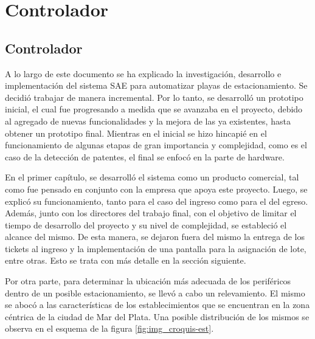 \chapter{Controlador}  \label{cap:Controlador}

\section{Controlador}

A lo largo de este documento se ha explicado la investigación, desarrollo e implementación del sistema SAE para automatizar playas de estacionamiento. Se decidió trabajar de manera incremental. Por lo tanto, se desarrolló un prototipo inicial, el cual fue progresando a medida que se avanzaba en el proyecto, debido al agregado de nuevas funcionalidades y la mejora de las ya existentes, hasta obtener un prototipo final. Mientras en el inicial se hizo hincapié en el funcionamiento de algunas etapas de gran importancia y complejidad, como es el caso de la detección de patentes, el final se enfocó en la parte de hardware. 

En el primer capítulo, se desarrolló el sistema como un producto comercial, tal como fue pensado en conjunto con la empresa que apoya este proyecto. Luego, se explicó su funcionamiento, tanto para el caso del ingreso como para el del egreso. Además, junto con los directores del trabajo final, con el objetivo de limitar el tiempo de desarrollo del proyecto y su nivel de complejidad, se estableció el alcance del mismo. De esta manera, se dejaron fuera del mismo la entrega de los tickets al ingreso y la implementación de una pantalla para  la asignación de lote, entre otras. Esto se trata con más detalle en la sección siguiente.

Por otra parte, para determinar la ubicación más adecuada de los periféricos dentro de un posible estacionamiento, se llevó a cabo un relevamiento. El mismo se abocó a las características de los establecimientos que se encuentran en la zona céntrica de la ciudad de Mar del Plata. Una posible distribución de los mismos se observa en el esquema de la figura \ref{fig:img_croquis-est}.

